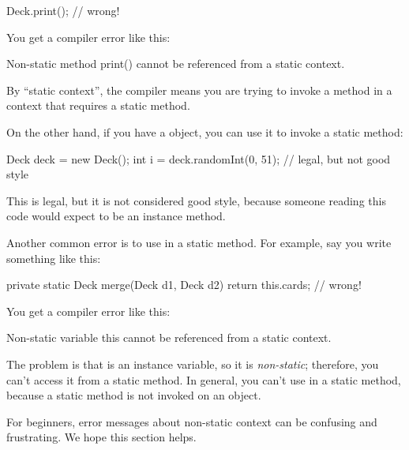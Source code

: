 \begin{code}
Deck.print();  // wrong!
\end{code}


You get a compiler error like this:

\begin{stdout}
Non-static method print() cannot be referenced from a
static context.
\end{stdout}

By ``static context'', the compiler means you are trying to invoke a method in a context that requires a static method.

On the other hand, if you have a  object, you can use it to invoke a static method:

\begin{code}
Deck deck = new Deck();
int i = deck.randomInt(0, 51);  // legal, but not good style
\end{code}

This is legal, but it is not considered good style, because someone reading this code would expect  to be an instance method.

Another common error is to use  in a static method.
For example, say you write something like this:

\begin{code}
private static Deck merge(Deck d1, Deck d2) {
    return this.cards;  // wrong!
}
\end{code}

You get a compiler error like this:

\begin{stdout}
Non-static variable this cannot be referenced from a
static context.
\end{stdout}

The problem is that  is an instance variable, so it is {\em non-static}; therefore, you can't access it from a static method.
In general, you can't use  in a static method, because a static method is not invoked on an object.

For beginners, error messages about non-static context can be confusing and frustrating.
We hope this section helps.


%


